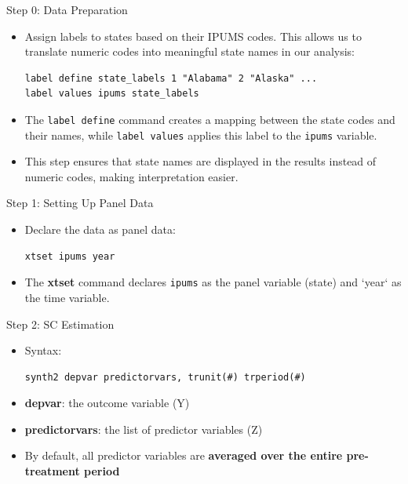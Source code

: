 \documentclass[dvipsnames,hyperref={pdfpagelabels=false}]{beamer}
\begin{document}
\begin{frame}[fragile]{Step 0: Data Preparation}
\begin{itemize}
	\item Assign labels to states based on their IPUMS codes. This allows us to translate numeric codes into meaningful state names in our analysis:
	\vspace{0.2cm}
\begin{lstlisting}
label define state_labels 1 "Alabama" 2 "Alaska" ...
label values ipums state_labels
\end{lstlisting}
	\item The \texttt{label define} command creates a mapping between the state codes and their names, while \texttt{label values} applies this label to the \texttt{ipums} variable.
	\vspace{0.2cm}
	\item This step ensures that state names are displayed in the results instead of numeric codes, making interpretation easier.
\end{itemize}
\end{frame}





\begin{frame}[fragile]{Step 1: Setting Up Panel Data}
\begin{itemize}
	\item Declare the data as panel data:
\begin{lstlisting}
xtset ipums year
\end{lstlisting}
	\item The \textbf{xtset} command declares \texttt{ipums} as the panel variable (state) and `year` as the time variable.

\end{itemize}
\end{frame}


\begin{frame}[fragile]{Step 2: SC Estimation}
\begin{itemize}
	\item Syntax:	
\begin{lstlisting}
synth2 depvar predictorvars, trunit(#) trperiod(#)
\end{lstlisting}
	
	\item \textbf{depvar}: the outcome variable (Y)
	\vspace{0.2cm}
	\item \textbf{predictorvars}: the list of predictor variables (Z)
	\vspace{0.2cm}
	\item By default, all predictor variables are \textbf{averaged over the entire pre-treatment period}
\end{itemize}


\end{frame}
\end{document}
